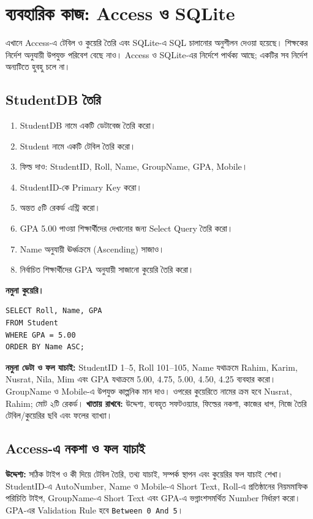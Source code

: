 \section{ব্যবহারিক কাজ: Access ও SQLite}

এখানে Access-এ টেবিল ও কুয়েরি তৈরি এবং SQLite-এ SQL চালানোর অনুশীলন দেওয়া হয়েছে। শিক্ষকের নির্দেশ অনুযায়ী উপযুক্ত পরিবেশ বেছে নাও। Access ও SQLite-এর নির্দেশে পার্থক্য আছে; একটির সব নির্দেশ অন্যটিতে হুবহু চলে না।

\subsection{StudentDB তৈরি}
\begin{enumerate}
    \item StudentDB নামে একটি ডেটাবেজ তৈরি করো।
    \item Student নামে একটি টেবিল তৈরি করো।
    \item ফিল্ড দাও: StudentID, Roll, Name, GroupName, GPA, Mobile।
    \item StudentID-কে Primary Key করো।
    \item অন্তত ৫টি রেকর্ড এন্ট্রি করো।
    \item GPA 5.00 পাওয়া শিক্ষার্থীদের দেখানোর জন্য Select Query তৈরি করো।
    \item Name অনুযায়ী ঊর্ধ্বক্রমে (Ascending) সাজাও।
    \item নির্বাচিত শিক্ষার্থীদের GPA অনুযায়ী সাজানো কুয়েরি তৈরি করো।
\end{enumerate}

\noindent\textbf{নমুনা কুয়েরি।} \begin{verbatim}
SELECT Roll, Name, GPA
FROM Student
WHERE GPA = 5.00
ORDER BY Name ASC;
\end{verbatim}

\textbf{নমুনা ডেটা ও ফল যাচাই:} StudentID 1--5, Roll 101--105, Name যথাক্রমে Rahim, Karim, Nusrat, Nila, Mim এবং GPA যথাক্রমে 5.00, 4.75, 5.00, 4.50, 4.25 ব্যবহার করো। GroupName ও Mobile-এ উপযুক্ত কাল্পনিক মান দাও। ওপরের কুয়েরিতে নামের ক্রম হবে Nusrat, Rahim; মোট ২টি রেকর্ড।
\textbf{খাতায় রাখবে:} উদ্দেশ্য, ব্যবহৃত সফটওয়্যার, ফিল্ডের নকশা, কাজের ধাপ, নিজে তৈরি টেবিল/কুয়েরির ছবি এবং ফলের ব্যাখ্যা।


\subsection{Access-এ নকশা ও ফল যাচাই}
\textbf{উদ্দেশ্য:} সঠিক টাইপ ও কী দিয়ে টেবিল তৈরি, তথ্য যাচাই, সম্পর্ক স্থাপন এবং কুয়েরির ফল যাচাই শেখা। StudentID-এ AutoNumber, Name ও Mobile-এ Short Text, Roll-এ প্রতিষ্ঠানের নিয়মমাফিক পরিচিতি টাইপ, GroupName-এ Short Text এবং GPA-এ ভগ্নাংশসমর্থিত Number নির্ধারণ করো। GPA-এর Validation Rule হবে \texttt{Between 0 And 5}।

